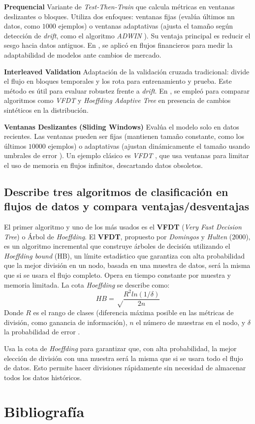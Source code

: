 \documentclass[12pt,letterpaper]{article}
\begin{document}
\textbf{Prequencial}
Variante de \textit{Test-Then-Train} que calcula métricas en ventanas deslizantes o bloques. Utiliza dos enfoques: ventanas fijas (evalúa últimos nn datos, como $1000$ ejemplos) o ventanas adaptativas (ajusta el tamaño según detección de \textit{drift}, como el algoritmo \textit{ADWIN} \cite{Bifet2007}). Su ventaja principal es reducir el sesgo hacia datos antiguos. En \cite{Gama2010}, se aplicó en flujos financieros para medir la adaptabilidad de modelos ante cambios de mercado.

\textbf{Interleaved Validation}
Adaptación de la validación cruzada tradicional: divide el flujo en bloques temporales y los rota para entrenamiento y prueba. Este método es útil para evaluar robustez frente a \textit{drift}. En \cite{Gama2014}, se empleó para comparar algoritmos como \textit{VFDT} y \textit{Hoeffding Adaptive Tree} en presencia de cambios sintéticos en la distribución.

\textbf{Ventanas Deslizantes (Sliding Windows)}
Evalúa el modelo solo en datos recientes. Las ventanas pueden ser fijas (mantienen tamaño constante, como los últimos $10000$ ejemplos) o adaptativas (ajustan dinámicamente el tamaño usando umbrales de error \cite{Bifet2009}). Un ejemplo clásico es \textit{VFDT} \cite{Domingos2000}, que usa ventanas para limitar el uso de memoria en flujos infinitos, descartando datos obsoletos.

\subsection{Describe tres algoritmos de clasificación en flujos de datos y compara
ventajas/desventajas}
El primer algoritmo y uno de los más usados es el \textbf{VFDT} (\textit{Very Fast Decision Tree}) o Árbol de \textit{Hoeffding}.
El \textbf{VFDT}, propuesto por \textit{Domingos} y \textit{Hulten} ($2000$), es un algoritmo incremental que construye árboles de decisión utilizando el \textit{Hoeffding bound} (HB), un límite estadístico que garantiza con alta probabilidad que la mejor división en un nodo, basada en una muestra de datos, será la misma que si se usara el flujo completo. Opera en tiempo constante por muestra y memoria limitada. La cota \textit{Hoeffding} se describe como:
$$HB=\sqrt\frac{R^2ln(1/\delta)}{2n}$$
Donde $R$ es el rango de clases (diferencia máxima posible en las métricas de división, como ganancia de información), $n$ el número de muestras en el nodo, y $\delta$ la probabilidad de error \cite{Domingos2000}.

Usa la cota de \textit{Hoeffding} para garantizar que, con alta probabilidad, la mejor elección de división con una muestra será la misma que si se usara todo el flujo de datos. Esto permite hacer divisiones rápidamente sin necesidad de almacenar todos los datos históricos.



\newpage
\section{Bibliografía}

\printbibliography[heading=none, category=cited]
\end{document}
